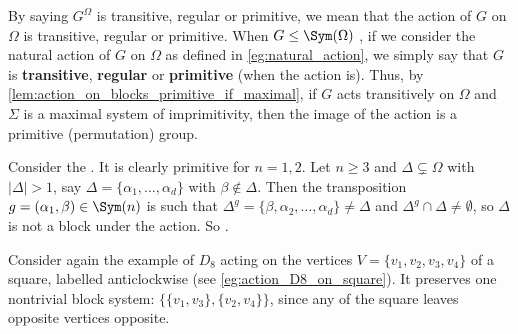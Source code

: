 By saying $G^\Omega$ is transitive, regular or primitive, we mean that the action of $G$ on $\Omega$ is transitive, regular or primitive. When $G \leq \Sym(\Omega)$ , if we consider the natural action of $G$ on $\Omega$ as defined in \autoref{eg:natural_action}, we simply say that $G$ is \textbf{transitive}, \textbf{regular} or \textbf{primitive} (when the action is). Thus, by \autoref{lem:action_on_blocks_primitive_if_maximal}, if $G$ acts transitively on $\Omega$ and $\Sigma$ is a maximal system of imprimitivity, then the image of the action is a primitive (permutation) group.


\begin{example}\label{eg:natural_action_Sn_blocks}
    Consider the . It is clearly primitive for $n = 1,2$. Let $n \geq 3$ and $\Delta \subsetneq \Omega$ with $|\Delta| > 1$, say $\Delta = \{\alpha_1,\dotsc,\alpha_d\}$ with $\beta \not\in \Delta$. Then the transposition $g = (\alpha_1,\beta) \in \Sym(n)$ is such that $\Delta^g = \{\beta,\alpha_2,\dotsc,\alpha_d\} \neq \Delta$ and $\Delta^g \cap \Delta \neq \emptyset$, so $\Delta$ is not a block under the action. So .
\end{example}

\begin{example}\label{eg:action_D8_on_square_blocks}
    Consider again the example of $D_8$ acting  on the vertices $V = \{v_1,v_2,v_3,v_4\}$ of a square, labelled anticlockwise (see \autoref{eg:action_D8_on_square}). It preserves one nontrivial block system: $\{\{v_1,v_3\},\{v_2,v_4\}\}$, since any  of the square leaves opposite vertices opposite. 
\end{example}

